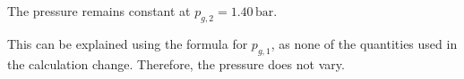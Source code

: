 The pressure remains constant at \( p_{g,2} = 1.40 \, \text{bar} \).  

This can be explained using the formula for \( p_{g,1} \), as none of the quantities used in the calculation change. Therefore, the pressure does not vary.